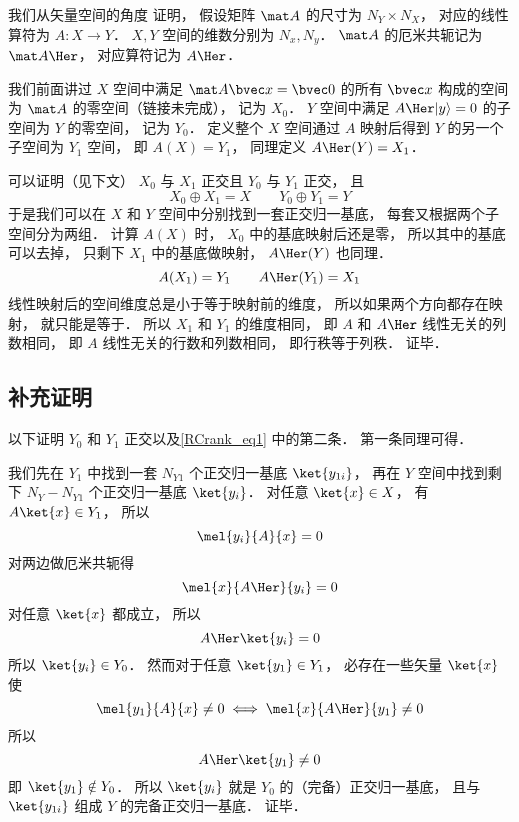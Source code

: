 

我们从矢量空间的角度 证明， 假设矩阵 $\mat A$ 的尺寸为 $N_Y \times N_X$， 对应的线性算符为 $A: X\to Y$． $X, Y$ 空间的维数分别为 $N_x, N_y$． $\mat A$ 的厄米共轭记为 $\mat A\Her$， 对应算符记为 $A\Her$．

我们前面讲过 $X$ 空间中满足 $\mat A \bvec x = \bvec 0$ 的所有 $\bvec x$ 构成的空间为 $\mat A$ 的零空间（链接未完成）， 记为 $X_0$． $Y$ 空间中满足 $A\Her |y\rangle = 0$ 的子空间为 $Y$ 的零空间， 记为 $Y_0$． 定义整个 $X$ 空间通过 $A$ 映射后得到 $Y$ 的另一个子空间为 $Y_1$ 空间， 即 $A(X) = Y_1$， 同理定义 $A\Her(Y) = X_1$． %

可以证明（见下文） $X_0$ 与 $X_1$ 正交且 $Y_0$ 与 $Y_1$ 正交， 且
\begin{equation}\label{RCrank_eq1}
X_0 \oplus X_1 = X
\qquad
Y_0 \oplus Y_1 = Y
\end{equation}
于是我们可以在 $X$ 和 $Y$ 空间中分别找到一套正交归一基底， 每套又根据两个子空间分为两组． 计算 $A(X)$ 时， $X_0$ 中的基底映射后还是零， 所以其中的基底可以去掉， 只剩下 $X_1$ 中的基底做映射， $A\Her(Y)$ 也同理．
\begin{equation}
A(X_1) = Y_1
\qquad
A\Her(Y_1) = X_1
\end{equation}
线性映射后的空间维度总是小于等于映射前的维度， 所以如果两个方向都存在映射， 就只能是等于． 所以 $X_1$ 和 $Y_1$ 的维度相同， 即 $A$ 和 $A\Her$ 线性无关的列数相同， 即 $A$ 线性无关的行数和列数相同， 即行秩等于列秩． 证毕．

\subsection{补充证明}
以下证明 $Y_0$ 和 $Y_1$ 正交以及\autoref{RCrank_eq1} 中的第二条． 第一条同理可得．

我们先在 $Y_1$ 中找到一套 $N_{Y1}$ 个正交归一基底 $\ket{y_{1i}}$， 再在 $Y$ 空间中找到剩下 $N_Y - N_{Y1}$ 个正交归一基底 $\ket{y_i}$． 对任意 $\ket{x} \in X$， 有 $A \ket{x} \in Y_1$， 所以
\begin{equation}
\mel{y_i}{A}{x} = 0
\end{equation}
对两边做厄米共轭得%
\begin{equation}
\mel{x}{A\Her}{y_i} = 0
\end{equation}
对任意 $\ket{x}$ 都成立， 所以
\begin{equation}
A\Her\ket{y_i} = 0
\end{equation}
所以 $\ket{y_i} \in Y_0$． 然而对于任意 $\ket{y_1} \in Y_1$， 必存在一些矢量 $\ket{x}$ 使
\begin{equation}
\mel{y_1}{A}{x} \ne 0
\iff
\mel{x}{A\Her}{y_1} \ne 0
\end{equation}
所以
\begin{equation}
A\Her\ket{y_1} \ne 0
\end{equation}
即 $\ket{y_1} \notin Y_0$． 所以 $\ket{y_i}$ 就是 $Y_0$ 的（完备）正交归一基底， 且与 $\ket{y_{1i}}$ 组成 $Y$ 的完备正交归一基底． 证毕．
